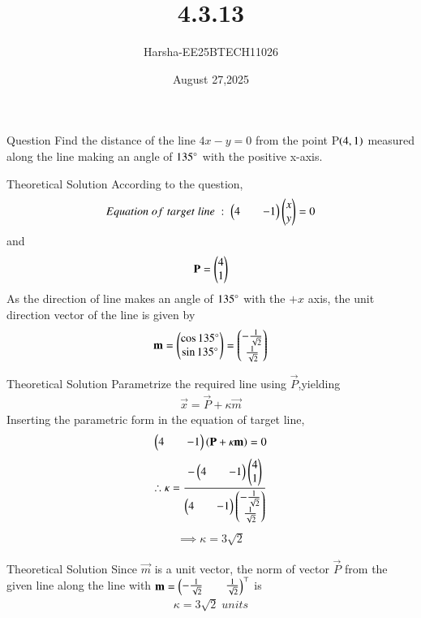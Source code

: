 \documentclass{beamer}
\title %
{4.3.13}
\date{August 27,2025}
\author %
{Harsha-EE25BTECH11026}
\begin{document}
\frame{\titlepage}


\begin{frame}{Question}
Find the distance of the line $4x-y=0$ from the point P$\left(4,1\right)$ measured along the line making an angle of $135\degree$ with the positive x-axis.
\end{frame}

\begin{frame}{Theoretical Solution}
According to the question,\\
\begin{align}
    Equation\;of\;target\;line\;:\;\begin{pmatrix}4&&-1\end{pmatrix}\begin{pmatrix}x\\y\end{pmatrix}=0
\end{align}
and
\begin{align}
    \mathbf{P}=\begin{pmatrix}4\\1\end{pmatrix}
\end{align}
As the direction of line makes an angle of $135\degree$ with the $+x$ axis, the unit direction vector of the line is given by
\begin{align}
    \mathbf{m}=\begin{pmatrix}\cos{135\degree}\\\sin{135\degree}\end{pmatrix}=\begin{pmatrix}-\frac{1}{\sqrt{2}}\\\frac{1}{\sqrt{2}}\end{pmatrix}
\end{align}
\end{frame}


\begin{frame}{Theoretical Solution}
Parametrize the required line using $\vec{P}$,yielding
\begin{align}
    \vec{x}=\vec{P}+\kappa\vec{m}
\end{align}
Inserting the parametric form in the equation of target line,
\begin{align}
    \begin{pmatrix}4&&-1\end{pmatrix}\left(\mathbf{P}+\kappa\mathbf{m}\right)=0
\end{align}
\begin{align}
    \therefore \kappa=\frac{-\begin{pmatrix}4&&-1\end{pmatrix}\begin{pmatrix}4\\1\end{pmatrix}}{\begin{pmatrix}4&&-1\end{pmatrix}\begin{pmatrix}-\frac{1}{\sqrt{2}}\\\frac{1}{\sqrt{2}}\end{pmatrix}}
\end{align}
\begin{align}
    \implies \kappa=3\sqrt{2}
\end{align}
\end{frame}

\begin{frame}{Theoretical Solution}
Since $\vec{m}$ is a unit vector, the norm of vector $\vec{P}$ from the given line along the line with $\mathbf{m}=\begin{pmatrix}-\frac{1}{\sqrt{2}}&&\frac{1}{\sqrt{2}}\end{pmatrix}^{\top}$ is
\begin{align}
    \kappa=3\sqrt{2}\;units
\end{align}
\end{frame}
\end{document}
